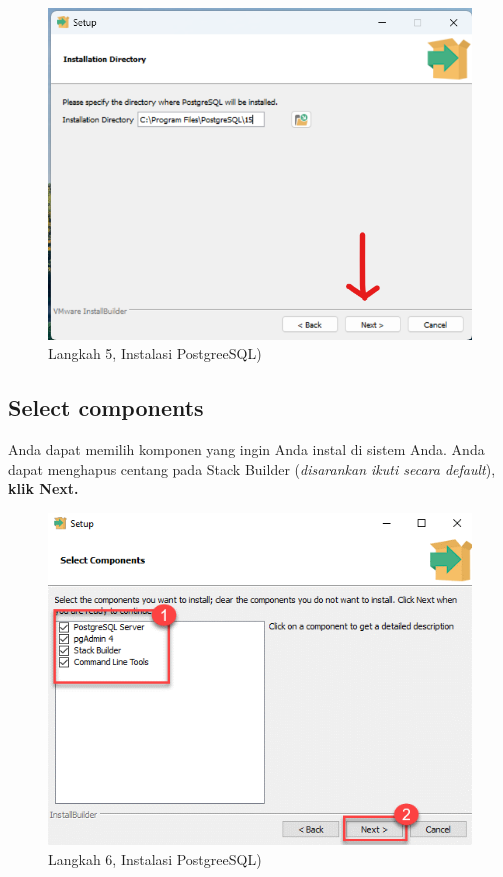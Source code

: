 \documentclass[
]{book}
\begin{document}
\begin{figure}

{\centering \includegraphics[width=1\linewidth]{./images/Bab1/Postgree4} 

}

\caption{Langkah 5, Instalasi PostgreeSQL)}\label{fig:install-posrgree5}
\end{figure}

\hypertarget{select-components}{%
\subsection{Select components}\label{select-components}}

Anda dapat memilih komponen yang ingin Anda instal di sistem Anda. Anda dapat menghapus centang pada Stack Builder (\emph{disarankan ikuti secara default}), \textbf{klik Next.}

\begin{figure}

{\centering \includegraphics[width=1\linewidth]{./images/Bab1/Postgree5} 

}

\caption{Langkah 6, Instalasi PostgreeSQL)}\label{fig:install-posrgree6}
\end{figure}
\end{document}

